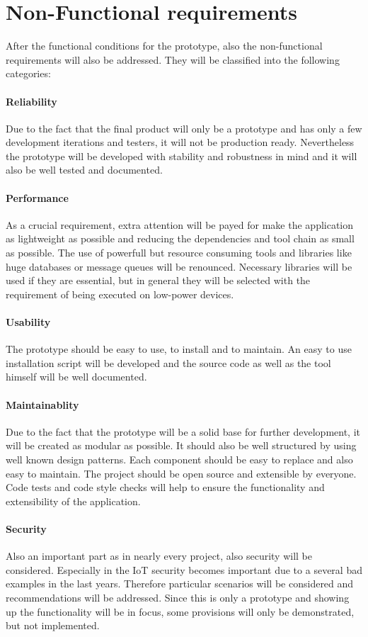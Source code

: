 \section{Non-Functional requirements}
\label{section:non-functional-requirements}
After the functional conditions for the prototype, also the non-functional requirements will also be addressed.
They will be classified into the following categories:

\paragraph{Reliability} Due to the fact that the final product will only be a prototype and has only a few development iterations and testers, it will not be production ready. Nevertheless the prototype will be developed with stability and robustness in mind and it will also be well tested and documented.
\paragraph{Performance} As a crucial requirement, extra attention will be payed for make the application as lightweight as possible and reducing the dependencies and tool chain as small as possible.
The use of powerfull but resource consuming tools and libraries like huge databases or message queues will be renounced.
Necessary libraries will be used if they are essential, but in general they will be selected with the requirement of being executed on low-power devices.
\paragraph{Usability} The prototype should be easy to use, to install and to maintain.
An easy to use installation script will be developed and the source code as well as the tool himself will be well documented.
\paragraph{Maintainablity} Due to the fact that the prototype will be a solid base for further development, it will be created as modular as possible.
It should also be well structured by using well known design patterns.
Each component should be easy to replace and also easy to maintain.
The project should be open source and extensible by everyone.
Code tests and code style checks will help to ensure the functionality and extensibility of the application.
\paragraph{Security} Also an important part as in nearly every project, also security will be considered.
Especially in the \ac{IoT} security becomes important due to a several bad examples in the last years.%
Therefore particular scenarios will be considered and recommendations will be addressed.
Since this is only a prototype and showing up the functionality will be in focus, some provisions will only be demonstrated, but not implemented.
